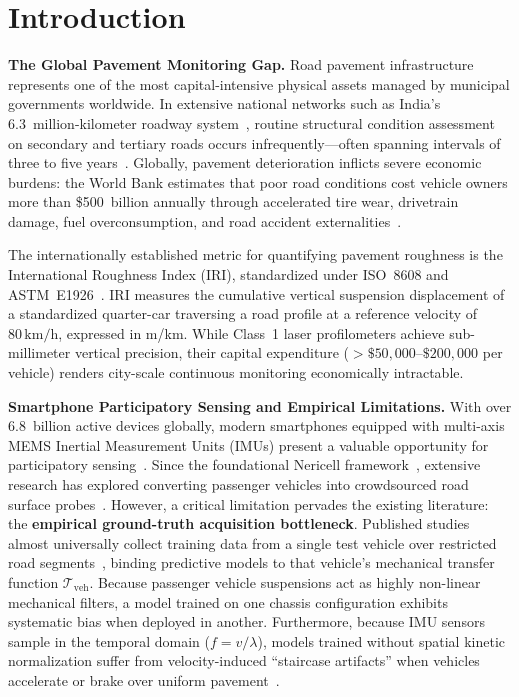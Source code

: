 \documentclass[conference]{IEEEtran}
\begin{document}
\section{Introduction}

\textbf{The Global Pavement Monitoring Gap.}
Road pavement infrastructure represents one of the most capital-intensive physical assets managed by municipal governments worldwide. In extensive national networks such as India's 6.3~million-kilometer roadway system~\cite{1}, routine structural condition assessment on secondary and tertiary roads occurs infrequently—often spanning intervals of three to five years~\cite{1}. Globally, pavement deterioration inflicts severe economic burdens: the World Bank estimates that poor road conditions cost vehicle owners more than \$500~billion annually through accelerated tire wear, drivetrain damage, fuel overconsumption, and road accident externalities~\cite{2}.

The internationally established metric for quantifying pavement roughness is the International Roughness Index (IRI), standardized under ISO~8608 and ASTM~E1926~\cite{3}. IRI measures the cumulative vertical suspension displacement of a standardized quarter-car traversing a road profile at a reference velocity of $80\,\text{km/h}$, expressed in m/km. While Class~1 laser profilometers achieve sub-millimeter vertical precision, their capital expenditure ($>\$50{,}000$--$\$200{,}000$ per vehicle) renders city-scale continuous monitoring economically intractable.

\textbf{Smartphone Participatory Sensing and Empirical Limitations.}
With over 6.8~billion active devices globally, modern smartphones equipped with multi-axis MEMS Inertial Measurement Units (IMUs) present a valuable opportunity for participatory sensing~\cite{4}. Since the foundational Nericell framework~\cite{5}, extensive research has explored converting passenger vehicles into crowdsourced road surface probes~\cite{6,7,8}. However, a critical limitation pervades the existing literature: the \textbf{empirical ground-truth acquisition bottleneck}. Published studies almost universally collect training data from a single test vehicle over restricted road segments~\cite{6,7}, binding predictive models to that vehicle's mechanical transfer function $\mathcal{T}_{\text{veh}}$. Because passenger vehicle suspensions act as highly non-linear mechanical filters, a model trained on one chassis configuration exhibits systematic bias when deployed in another. Furthermore, because IMU sensors sample in the temporal domain ($f = v/\lambda$), models trained without spatial kinetic normalization suffer from velocity-induced ``staircase artifacts'' when vehicles accelerate or brake over uniform pavement~\cite{6,8}.
\end{document}
